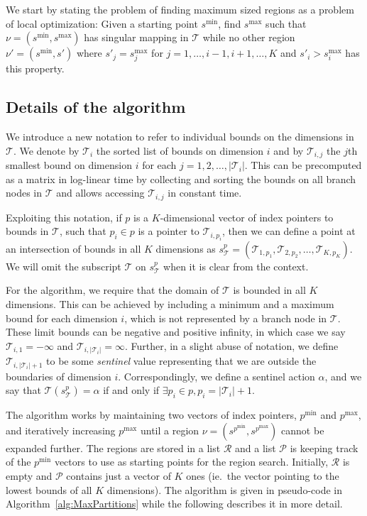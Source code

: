We start by stating the problem of finding maximum sized regions as a problem of
local optimization: Given a starting point $s^{\min}$, find $s^{\max}$ such that
$\nu = (s^{\min}, s^{\max})$ has singular mapping in $\mathcal{T}$ while no
other region $\nu' = (s^{\min}, s')$ where $s'_j = s^{\max}_j$ for $j =
1,\ldots,i-1,i+1,\ldots,K$ and $s'_i > s^{\max}_i$ has this property.


\subsection{Details of the algorithm}%
\label{sub:maxPartsDescription}

We introduce a new notation to refer to individual bounds on the dimensions in
$\mathcal{T}$. We denote by $\mathcal{T}_i$ the sorted list of bounds on
dimension $i$ and by $\mathcal{T}_{i,j}$ the $j$th smallest bound on dimension
$i$ for each $j = 1,2,\ldots,|\mathcal{T}_i|$. This can be precomputed as a
matrix in log-linear time by collecting and sorting the bounds on all branch
nodes in $\mathcal{T}$ and allows accessing $\mathcal{T}_{i,j}$ in constant
time.

Exploiting this notation, if $p$ is a $K$-dimensional vector of index pointers
to bounds in $\mathcal{T}$, such that $p_i \in p$ is a pointer to
$\mathcal{T}_{i,p_i}$, then we can define a point at an intersection of bounds
in all $K$ dimensions as $s^{p}_{\mathcal{T}} =
(\mathcal{T}_{1,p_1},\mathcal{T}_{2,p_2},\ldots,\mathcal{T}_{K,p_K})$. We will
omit the subscript $\mathcal{T}$ on $s^{p}_{\mathcal{T}}$ when it is clear from
the context.

For the algorithm, we require that the domain of $\mathcal{T}$ is bounded in all
$K$ dimensions. This can be achieved by including a minimum and a maximum bound
for each dimension $i$, which is not represented by a branch node in
$\mathcal{T}$. These limit bounds can be negative and positive infinity, in
which case we say $\mathcal{T}_{i,1} = -\infty$ and
$\mathcal{T}_{i,|\mathcal{T}_{i}|} = \infty$. Further, in a slight abuse of
notation, we define $\mathcal{T}_{i,|\mathcal{T}_i| + 1}$ to be some
\textit{sentinel} value representing that we are outside the boundaries of
dimension $i$.  Correspondingly, we define a sentinel action $\alpha$, and we
say that $\mathcal{T}(s^p_{\mathcal{T}}) = \alpha$ if and only if $\exists p_i
\in p, p_i = |\mathcal{T}_i| + 1$.

The algorithm works by maintaining two vectors of index pointers, $p^{\min}$ and
$p^{\max}$, and iteratively increasing $p^{\max}$ until a region $\nu =
(s^{p^{\min}}, s^{p^{\max}})$ cannot be expanded further. The regions are stored
in a list $\mathcal{R}$ and a list $\mathcal{P}$ is keeping track of the
$p^{\min}$ vectors to use as starting points for the region search. Initially,
$\mathcal{R}$ is empty and $\mathcal{P}$ contains just a vector of $K$ ones
(ie.\ the vector pointing to the lowest bounds of all $K$ dimensions). The
algorithm is given in pseudo-code in Algorithm~\ref{alg:MaxPartitions} while the
following describes it in more detail.

